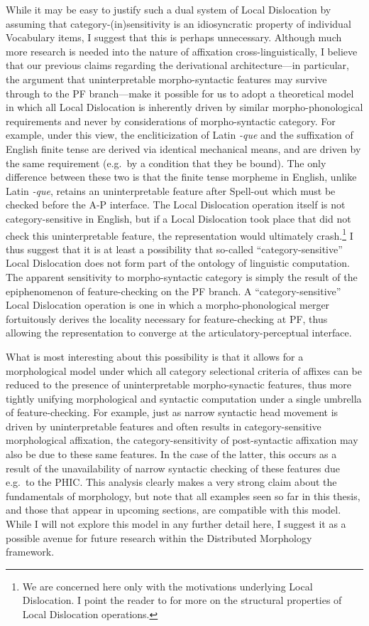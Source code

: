 While it may be easy to justify such a dual system of Local Dislocation by assuming that category-(in)sensitivity is an idiosyncratic property of individual Vocabulary items, I suggest that this is perhaps unnecessary. Although much more research is needed into the nature of affixation cross-linguistically, I believe that our previous claims regarding the derivational architecture---in particular, the argument that uninterpretable morpho-syntactic features may survive through to the PF branch---make it possible for us to adopt a theoretical model in which all Local Dislocation is inherently driven by similar morpho-phonological requirements and never by considerations of morpho-syntactic category. For example, under this view, the encliticization of Latin {\it -que} and the suffixation of English finite tense are derived via identical mechanical means, and are driven by the same requirement (e.g.\ by a condition that they be bound). The only difference between these two is that the finite tense morpheme in English, unlike Latin {\it -que}, retains an uninterpretable feature after Spell-out which must be checked before the A-P interface. The Local Dislocation operation itself is not category-sensitive in English, but if a Local Dislocation took place that did not check this uninterpretable feature, the representation would ultimately crash.\footnote{We are concerned here only with the motivations underlying Local Dislocation. I point the reader to \citet{embick2006} for more on the structural properties of Local Dislocation operations.} I thus suggest that it is at least a possibility that so-called ``category-sensitive'' Local Dislocation does not form part of the ontology of linguistic computation. The apparent sensitivity to morpho-syntactic category is simply the result of the epiphenomenon of feature-checking on the PF branch. A ``category-sensitive'' Local Dislocation operation is one in which a morpho-phonological merger fortuitously derives the locality necessary for feature-checking at PF, thus allowing the representation to converge at the articulatory-perceptual interface.

What is most interesting about this possibility is that it allows for a morphological model under which all category selectional criteria of affixes can be reduced to the presence of uninterpretable morpho-synactic features, thus more tightly unifying morphological and syntactic computation under a single umbrella of feature-checking. For example, just as narrow syntactic head movement is driven by uninterpretable features and often results in category-sensitive morphological affixation, the category-sensitivity of post-syntactic affixation may also be due to these same features. In the case of the latter, this occurs as a result of the unavailability of narrow syntactic checking of these features due e.g.\ to the PHIC. This analysis clearly makes a very strong claim about the fundamentals of morphology, but note that all examples seen so far in this thesis, and those that appear in upcoming sections, are compatible with this model. While I will not explore this model in any further detail here, I suggest it as a possible avenue for future research within the Distributed Morphology framework.


